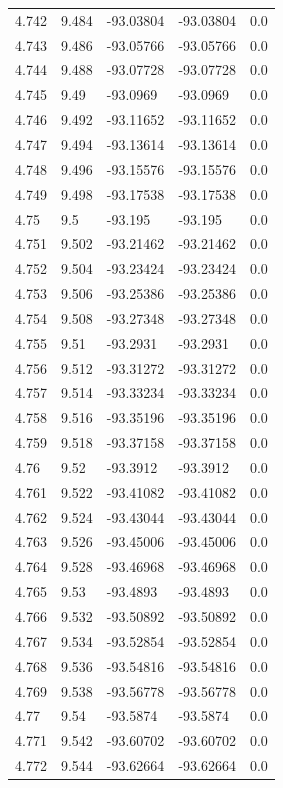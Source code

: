 \begin{tabular}{lllll}
4.742 & 9.484 & -93.03804 & -93.03804 & 0.0 \\
4.743 & 9.486 & -93.05766 & -93.05766 & 0.0 \\
4.744 & 9.488 & -93.07728 & -93.07728 & 0.0 \\
4.745 & 9.49 & -93.0969 & -93.0969 & 0.0 \\
4.746 & 9.492 & -93.11652 & -93.11652 & 0.0 \\
4.747 & 9.494 & -93.13614 & -93.13614 & 0.0 \\
4.748 & 9.496 & -93.15576 & -93.15576 & 0.0 \\
4.749 & 9.498 & -93.17538 & -93.17538 & 0.0 \\
4.75 & 9.5 & -93.195 & -93.195 & 0.0 \\
4.751 & 9.502 & -93.21462 & -93.21462 & 0.0 \\
4.752 & 9.504 & -93.23424 & -93.23424 & 0.0 \\
4.753 & 9.506 & -93.25386 & -93.25386 & 0.0 \\
4.754 & 9.508 & -93.27348 & -93.27348 & 0.0 \\
4.755 & 9.51 & -93.2931 & -93.2931 & 0.0 \\
4.756 & 9.512 & -93.31272 & -93.31272 & 0.0 \\
4.757 & 9.514 & -93.33234 & -93.33234 & 0.0 \\
4.758 & 9.516 & -93.35196 & -93.35196 & 0.0 \\
4.759 & 9.518 & -93.37158 & -93.37158 & 0.0 \\
4.76 & 9.52 & -93.3912 & -93.3912 & 0.0 \\
4.761 & 9.522 & -93.41082 & -93.41082 & 0.0 \\
4.762 & 9.524 & -93.43044 & -93.43044 & 0.0 \\
4.763 & 9.526 & -93.45006 & -93.45006 & 0.0 \\
4.764 & 9.528 & -93.46968 & -93.46968 & 0.0 \\
4.765 & 9.53 & -93.4893 & -93.4893 & 0.0 \\
4.766 & 9.532 & -93.50892 & -93.50892 & 0.0 \\
4.767 & 9.534 & -93.52854 & -93.52854 & 0.0 \\
4.768 & 9.536 & -93.54816 & -93.54816 & 0.0 \\
4.769 & 9.538 & -93.56778 & -93.56778 & 0.0 \\
4.77 & 9.54 & -93.5874 & -93.5874 & 0.0 \\
4.771 & 9.542 & -93.60702 & -93.60702 & 0.0 \\
4.772 & 9.544 & -93.62664 & -93.62664 & 0.0 \\

\end{tabular}

